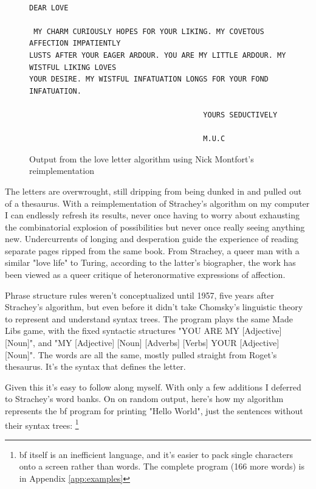 \documentclass[runningheads]{llncs}
\begin{document}
\begin{figure}
	\centering
    \begin{verbatim}

DEAR LOVE

 MY CHARM CURIOUSLY HOPES FOR YOUR LIKING. MY COVETOUS AFFECTION IMPATIENTLY
LUSTS AFTER YOUR EAGER ARDOUR. YOU ARE MY LITTLE ARDOUR. MY WISTFUL LIKING LOVES
YOUR DESIRE. MY WISTFUL INFATUATION LONGS FOR YOUR FOND INFATUATION.

                                        YOURS SEDUCTIVELY

                                        M.U.C\end{verbatim}
		\caption{Output from the love letter algorithm using Nick Montfort's reimplementation}\label{fig:muc}
\end{figure}
The letters are overwrought, still dripping from being dunked in and pulled out of a thesaurus. With a reimplementation \cite{montfort2014} of Strachey's algorithm on my computer I can endlessly refresh its results, never once having to worry about exhausting the combinatorial explosion of possibilities but never once really seeing anything new. Undercurrents of longing and desperation guide the experience of reading separate pages ripped from the same book. From Strachey, a queer man with a similar "love life" to Turing, according to the latter's biographer, \cite{hodges1992}
the work has been viewed as a queer critique of heteronormative expressions of affection.

Phrase structure rules weren't conceptualized until 1957, five years after Strachey's algorithm, but even before it didn't take Chomsky's linguistic theory to represent and understand syntax trees. The program plays the same Made Libs game, with the fixed syntactic structures "YOU ARE MY [Adjective] [Noun]", and "MY [Adjective] [Noun] [Adverbs] [Verbs] YOUR [Adjective] [Noun]". The words are all the same, mostly pulled straight from Roget's thesaurus. It's the syntax that defines the letter.

Given this it's easy to follow along myself. With only a few additions I deferred to Strachey's word banks. On on random output, here's how my algorithm represents the bf program for printing "Hello World", just the sentences without their syntax trees:
\footnote{bf itself is an inefficient language, and it's easier to pack single characters onto a screen rather than words. The complete program (166 more words) is in Appendix \ref{app:examples}}
\end{document}
